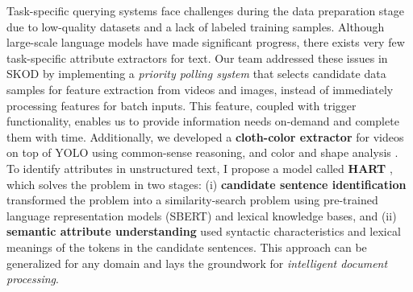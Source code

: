     Task-specific querying systems face challenges during the data preparation stage due to low-quality datasets and a lack of labeled training samples. Although large-scale language models have made significant progress, there exists very few task-specific attribute extractors for text. Our team addressed these issues in SKOD by implementing a \textit{priority polling system} that selects candidate data samples for feature extraction from videos and images, instead of immediately processing features for batch inputs. This feature, coupled with trigger functionality, enables us to provide information needs on-demand and complete them with time. Additionally, we developed a \textbf{cloth-color extractor} for videos on top of YOLO using common-sense reasoning, and color and shape analysis \cite{stonebraker2020surveillance}. To identify attributes in unstructured text, I propose a model called \textbf{HART} \cite{solaiman2022femmir}, which solves the problem in two stages: (i) \textbf{candidate sentence identification} transformed the problem into a similarity-search problem using pre-trained language representation models (SBERT) and lexical knowledge bases, and (ii) \textbf{semantic attribute understanding} used syntactic characteristics and lexical meanings of the tokens in the candidate sentences. This approach can be generalized for any domain and lays the groundwork for \textit{intelligent document processing}.
